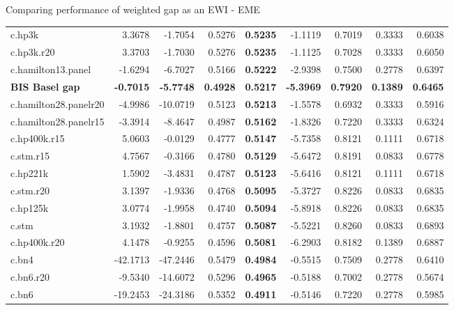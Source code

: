 \documentclass[
  ignorenonframetext,
]{beamer}
\begin{document}
\begin{frame}{Comparing performance of weighted gap as an EWI - EME}
{\begin{tabular}[t]{lrrr>{}rrrrr}
c.hp3k & 3.3678 & -1.7054 & 0.5276 & \textbf{0.5235} & -1.1119 & 0.7019 & 0.3333 & 0.6038\\
c.hp3k.r20 & 3.3703 & -1.7030 & 0.5276 & \textbf{0.5235} & -1.1125 & 0.7028 & 0.3333 & 0.6050\\
c.hamilton13.panel & -1.6294 & -6.7027 & 0.5166 & \textbf{0.5222} & -2.9398 & 0.7500 & 0.2778 & 0.6397\\
\textbf{BIS Basel gap} & \textbf{-0.7015} & \textbf{-5.7748} & \textbf{0.4928} & \textbf{\textbf{0.5217}} & \textbf{-5.3969} & \textbf{0.7920} & \textbf{0.1389} & \textbf{0.6465}\\
c.hamilton28.panelr20 & -4.9986 & -10.0719 & 0.5123 & \textbf{0.5213} & -1.5578 & 0.6932 & 0.3333 & 0.5916\\
\addlinespace
c.hamilton28.panelr15 & -3.3914 & -8.4647 & 0.4987 & \textbf{0.5162} & -1.8326 & 0.7220 & 0.3333 & 0.6324\\
c.hp400k.r15 & 5.0603 & -0.0129 & 0.4777 & \textbf{0.5147} & -5.7358 & 0.8121 & 0.1111 & 0.6718\\
c.stm.r15 & 4.7567 & -0.3166 & 0.4780 & \textbf{0.5129} & -5.6472 & 0.8191 & 0.0833 & 0.6778\\
c.hp221k & 1.5902 & -3.4831 & 0.4787 & \textbf{0.5123} & -5.6416 & 0.8121 & 0.1111 & 0.6718\\
c.stm.r20 & 3.1397 & -1.9336 & 0.4768 & \textbf{0.5095} & -5.3727 & 0.8226 & 0.0833 & 0.6835\\
\addlinespace
c.hp125k & 3.0774 & -1.9958 & 0.4740 & \textbf{0.5094} & -5.8918 & 0.8226 & 0.0833 & 0.6835\\
c.stm & 3.1932 & -1.8801 & 0.4757 & \textbf{0.5087} & -5.5221 & 0.8260 & 0.0833 & 0.6893\\
c.hp400k.r20 & 4.1478 & -0.9255 & 0.4596 & \textbf{0.5081} & -6.2903 & 0.8182 & 0.1389 & 0.6887\\
c.bn4 & -42.1713 & -47.2446 & 0.5479 & \textbf{0.4984} & -0.5515 & 0.7509 & 0.2778 & 0.6410\\
c.bn6.r20 & -9.5340 & -14.6072 & 0.5296 & \textbf{0.4965} & -0.5188 & 0.7002 & 0.2778 & 0.5674\\
\addlinespace
c.bn6 & -19.2453 & -24.3186 & 0.5352 & \textbf{0.4911} & -0.5146 & 0.7220 & 0.2778 & 0.5985\\
\bottomrule
\end{tabular}}
\end{frame}
\end{document}
